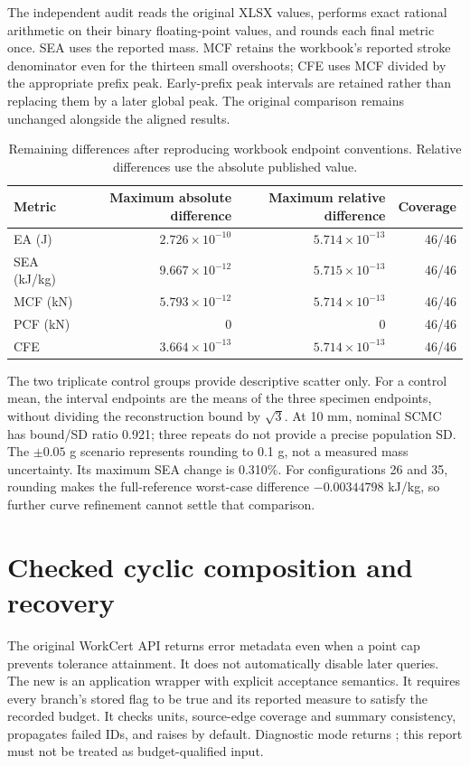 \documentclass[11pt,a4paper]{article}
\begin{document}
The independent audit reads the original XLSX values, performs exact rational arithmetic on their binary floating-point values, and rounds each final metric once. SEA uses the reported mass. MCF retains the workbook's reported stroke denominator even for the thirteen small overshoots; CFE uses MCF divided by the appropriate prefix peak. Early-prefix peak intervals are retained rather than replacing them by a later global peak. The original comparison remains unchanged alongside the aligned results.

\begin{table}[H]\centering
\caption{Remaining differences after reproducing workbook endpoint conventions. Relative differences use the absolute published value.}
\begin{tabular}{lrrr}\toprule
Metric&Maximum absolute difference&Maximum relative difference&Coverage\\\midrule
EA (J)&$2.726\times10^{-10}$&$5.714\times10^{-13}$&46/46\\
SEA (kJ/kg)&$9.667\times10^{-12}$&$5.715\times10^{-13}$&46/46\\
MCF (kN)&$5.793\times10^{-12}$&$5.714\times10^{-13}$&46/46\\
PCF (kN)&0&0&46/46\\
CFE&$3.664\times10^{-13}$&$5.714\times10^{-13}$&46/46\\\bottomrule
\end{tabular}\end{table}

The two triplicate control groups provide descriptive scatter only. For a control mean, the interval endpoints are the means of the three specimen endpoints, without dividing the reconstruction bound by $\sqrt3$. At 10 mm, nominal SCMC has bound/SD ratio 0.921; three repeats do not provide a precise population SD. The $\pm0.05$ g scenario represents rounding to 0.1 g, not a measured mass uncertainty. Its maximum SEA change is 0.310\%. For configurations 26 and 35, rounding makes the full-reference worst-case difference $-0.00344798$ kJ/kg, so further curve refinement cannot settle that comparison.

\section{Checked cyclic composition and recovery}
The original WorkCert API returns error metadata even when a point cap prevents tolerance attainment. It does not automatically disable later queries. The new  is an application wrapper with explicit acceptance semantics. It requires every branch's stored flag to be true and its reported measure to satisfy the recorded budget. It checks units, source-edge coverage and summary consistency, propagates failed IDs, and raises  by default. Diagnostic mode returns ; this report must not be treated as budget-qualified input.
\end{document}
